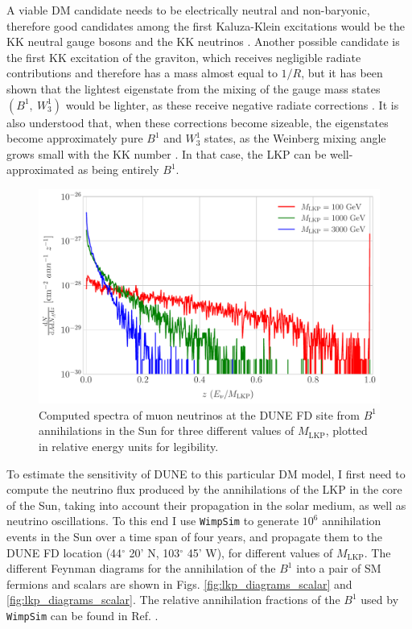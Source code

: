 A viable DM candidate needs to be electrically neutral and non-baryonic, therefore good candidates among the first Kaluza-Klein excitations would be the KK neutral gauge bosons and the KK neutrinos \cite{Servant2002}. Another possible candidate is the first KK excitation of the graviton, which receives negligible radiate contributions and therefore has a mass almost equal to $1/R$, but it has been shown that the lightest eigenstate from the mixing of the gauge mass states $\left(B^{1},~ W_{3}^{1}\right)$ would be lighter, as these receive negative radiate corrections \cite{Cheng2002}. It is also understood that, when these corrections become sizeable, the eigenstates become approximately pure $B^{1}$ and $W_{3}^{1}$ states, as the Weinberg mixing angle grows small with the KK number \cite{Cheng2002}. In that case, the LKP can be well-approximated as being entirely $B^{1}$.

\begin{figure}[t]
	\centering
	\includegraphics[width=0.9\linewidth]{Images/DM_Analysis/KK_nu_flux}
	\caption[Computed spectra of muon neutrinos at the DUNE FD site from $B^{1}$ annihilations in the Sun for various values of $M_{\mathrm{LKP}}$.]{Computed spectra of muon neutrinos at the DUNE FD site from $B^{1}$ annihilations in the Sun for three different values of $M_{\mathrm{LKP}}$, plotted in relative energy units for legibility.}
	\label{fig:KK_nu_flux}
\end{figure}

To estimate the sensitivity of DUNE to this particular DM model, I first need to compute the neutrino flux produced by the annihilations of the LKP in the core of the Sun, taking into account their propagation in the solar medium, as well as neutrino oscillations.  To this end I use \texttt{WimpSim} \cite{Blennow2007, WimpSim} to generate $10^{6}$ annihilation events in the Sun over a time span of four years, and propagate them to the DUNE FD location (44$^{\circ} $ 20' N, 103$^{\circ} $ 45' W), for different values of $M_{\mathrm{LKP}}$. The different Feynman diagrams for the annihilation of the $B^{1}$ into a pair of SM fermions and scalars are shown in Figs. \ref{fig:lkp_diagrams_scalar} and \ref{fig:lkp_diagrams_scalar}. The relative annihilation fractions of the $B^{1}$ used by \texttt{WimpSim} can be found in Ref. \cite{Hooper2007}.

